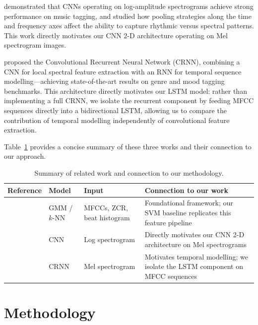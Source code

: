 \documentclass[12pt, a4paper]{article}
\begin{document}
\citet{choi2017convolutional} demonstrated that CNNs operating on log-amplitude
spectrograms achieve strong performance on music tagging, and studied how pooling
strategies along the time and frequency axes affect the ability to capture rhythmic
versus spectral patterns. This work directly motivates our CNN 2-D architecture
operating on Mel spectrogram images.

\citet{choi2017crnn} proposed the Convolutional Recurrent Neural Network (CRNN),
combining a CNN for local spectral feature extraction with an RNN for temporal sequence
modelling---achieving state-of-the-art results on genre and mood tagging benchmarks.
This architecture directly motivates our LSTM model: rather than implementing a full
CRNN, we isolate the recurrent component by feeding MFCC sequences directly into a
bidirectional LSTM, allowing us to compare the contribution of temporal modelling
independently of convolutional feature extraction.

Table~\ref{tab:litreview} provides a concise summary of these three works and their
connection to our approach.

\begin{table}[h!]
    \centering
    \caption{Summary of related work and connection to our methodology.}
    \label{tab:litreview}
    \begin{tabular}{p{3.2cm} p{3.0cm} p{3.0cm} p{3.4cm}}
        \toprule
        \textbf{Reference} & \textbf{Model} & \textbf{Input} & \textbf{Connection to our work} \\
        \midrule
        \citet{tzanetakis2002musical} & GMM / $k$-NN & MFCCs, ZCR, beat histogram &
            Foundational framework; our SVM baseline replicates this feature pipeline \\[6pt]
        \citet{choi2017convolutional} & CNN & Log spectrogram &
            Directly motivates our CNN 2-D architecture on Mel spectrograms \\[6pt]
        \citet{choi2017crnn} & CRNN & Mel spectrogram &
            Motivates temporal modelling; we isolate the LSTM component on MFCC sequences \\
        \bottomrule
    \end{tabular}
\end{table}

\section{Methodology}
\label{sec:methodology}
\end{document}
